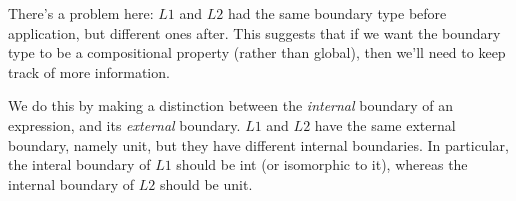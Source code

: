 \documentclass[]{article}
\begin{document}
There's a problem here: $L1$ and $L2$ had the same boundary type before application, but different ones after.
This suggests that if we want the boundary type to be a compositional property (rather than global),
then we'll need to keep track of more information.

We do this by making a distinction between the {\em internal} boundary of an expression,
and its {\em external} boundary.  
$L1$ and $L2$ have the same external boundary, namely unit,
but they have different internal boundaries.  
In particular, the interal boundary of $L1$ should be int (or isomorphic to it), 
whereas the internal boundary of $L2$ should be unit.


\end{document}
